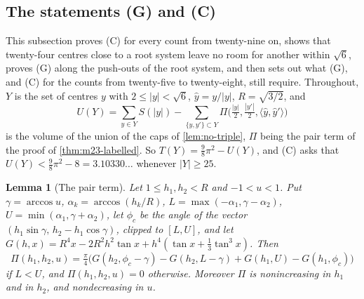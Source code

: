 \documentclass[11pt,reqno]{amsart}
\renewcommand{\_}{\origunderscore\allowbreak}
\numberwithin{equation}{section}
\theoremstyle{plain}
\newtheorem{lem}[thm]{Lemma}
\theoremstyle{definition}
\theoremstyle{remark}
\begin{document}
\subsection{The statements (G) and (C)}\label{sec:G-and-C}

This subsection proves (C) for every count from twenty-nine on, shows that
twenty-four centres close to a root system leave no room for another within
$\sqrt6$, proves (G) along the push-outs of the root system, and then sets
out what (G), and (C) for the counts from twenty-five to twenty-eight, still
require. Throughout, $Y$ is the set of centres $y$ with
$2\le|y|<\sqrt6$, $\hat y=y/|y|$, $R=\sqrt{3/2}$, and
\[
  U(Y)=\sum_{y\in Y}S(|y|)-\sum_{\{y,y'\}\subset Y}
  \Pi\bigl(\tfrac{|y|}2,\tfrac{|y'|}2,\langle\hat y,\hat y'\rangle\bigr)
\]
is the volume of the union of the caps of \cref{lem:no-triple}, $\Pi$ being
the pair term of the proof of \cref{thm:m23-labelled}. So
$T(Y)=\frac98\pi^2-U(Y)$, and (C) asks that $U(Y)<\frac98\pi^2-8=3.10330\ldots$
whenever $|Y|\ge25$.

\begin{lem}[The pair term]\label{lem:pair-closed}
Let $1\le h_1,h_2<R$ and $-1<u<1$. Put $\gamma=\arccos u$,
$\alpha_k=\arccos(h_k/R)$, $L=\max(-\alpha_1,\gamma-\alpha_2)$,
$U=\min(\alpha_1,\gamma+\alpha_2)$, let $\phi_c$ be the angle of the vector
$(h_1\sin\gamma,\,h_2-h_1\cos\gamma)$, clipped to $[L,U]$, and let
$G(h,x)=R^4x-2R^2h^2\tan x+h^4(\tan x+\frac13\tan^3x)$. Then
\[
  \Pi(h_1,h_2,u)=\tfrac\pi4\bigl(G(h_2,\phi_c-\gamma)-G(h_2,L-\gamma)
  +G(h_1,U)-G(h_1,\phi_c)\bigr)
\]
if $L<U$, and $\Pi(h_1,h_2,u)=0$ otherwise. Moreover $\Pi$ is nonincreasing
in $h_1$ and in $h_2$, and nondecreasing in $u$.
\end{lem}
\end{document}

